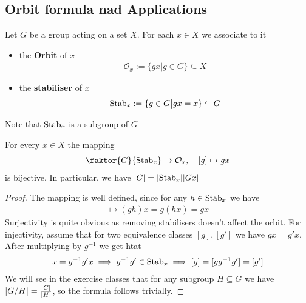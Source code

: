 \subsection{Orbit formula nad Applications}
\begin{dfn}[]
Let $G$ be a group acting on a set $X$. For each $x \in X$ we associate to it
\begin{itemize}
  \item the \textbf{Orbit} of $x$
    \begin{align*}
      \mathcal{O}_x := \{gx \big\vert g \in G\} \subseteq X
    \end{align*} 
  \item the \textbf{stabiliser} of $x$
    \begin{align*}
      \operatorname{Stab}_x :=\{g \in G \big\vert gx = x\} \subseteq G
    \end{align*}
\end{itemize}
Note that $\operatorname{Stab}_x$ is a subgroup of $G$
\end{dfn}

\begin{thm}
  For every $x \in X$ the mapping
  \begin{align*}
    \faktor{G}{\Stab_x} \to \mathcal{O}_x, \quad [g] \mapsto  gx
  \end{align*}
  is bijective. In particular, we have $\abs{G} = \abs{\Stab_x} \abs{Gx}$
\end{thm}
\begin{proof}
  The mapping is well defined, since for any $h \in \operatorname{Stab}_x$ we have
  \begin{align*}
    [gh] \mapsto (gh)x = g(hx) = gx
  \end{align*}
  Surjectivity is quite obvious as removing stabilisers doesn't affect the orbit.
  For injectivity, assume that for two equivalence classes $[g], [g']$ we have $gx = g'x$. After multiplying by $g^{-1}$ we get htat
  \begin{align*}
    x = g^{-1}g' x \implies g^{-1}g' \in \operatorname{Stab}_x \implies [g] = [gg^{-1}g'] = [g']
  \end{align*}
  We will see in the exercise classes that for any subgroup $H \subseteq G$ we have $\vert G/H\vert = \frac{\vert G\vert}{\vert H\vert}$, so the formula follows trivially.
\end{proof}


